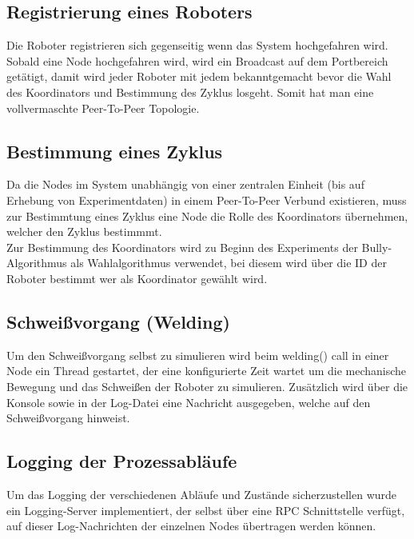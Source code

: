 \subsection{Registrierung eines Roboters}

Die Roboter registrieren sich gegenseitig wenn das System hochgefahren wird. Sobald eine Node hochgefahren
wird, wird ein Broadcast auf dem Portbereich getätigt, damit wird jeder Roboter mit jedem bekanntgemacht
bevor die Wahl des Koordinators und Bestimmung des Zyklus losgeht. Somit hat man eine vollvermaschte
Peer-To-Peer Topologie.

\subsection{Bestimmung eines Zyklus}

Da die Nodes im System unabhängig von einer zentralen Einheit (bis auf Erhebung von Experimentdaten)
in einem Peer-To-Peer \citep{tanenbaumvansteen} Verbund existieren, muss zur Bestimmtung 
eines Zyklus eine Node die Rolle des Koordinators \citep{tanenbaumvansteen} übernehmen, welcher den Zyklus bestimmmt.\\
Zur Bestimmung des Koordinators wird zu Beginn des Experiments der Bully-Algorithmus \citep{tanenbaumvansteen}
als Wahlalgorithmus verwendet, bei diesem wird über die ID der Roboter bestimmt wer als
Koordinator gewählt wird.

\subsection{Schweißvorgang (Welding)}

Um den Schweißvorgang selbst zu simulieren wird beim welding() call in einer Node ein Thread gestartet,
der eine konfigurierte Zeit wartet um die mechanische Bewegung und das Schweißen der Roboter zu simulieren. Zusätzlich wird über die Konsole sowie in der Log-Datei eine Nachricht ausgegeben,
welche auf den Schweißvorgang hinweist.

\subsection{Logging der Prozessabläufe}

Um das Logging der verschiedenen Abläufe und Zustände sicherzustellen wurde ein Logging-Server implementiert,
der selbst über eine RPC Schnittstelle verfügt, auf dieser Log-Nachrichten der einzelnen Nodes übertragen
werden können.

